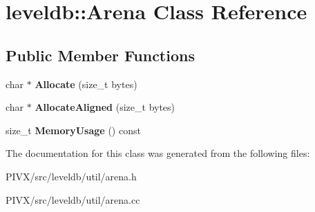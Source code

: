 \hypertarget{classleveldb_1_1_arena}{}\section{leveldb\+:\+:Arena Class Reference}
\label{classleveldb_1_1_arena}
\subsection*{Public Member Functions}
\begin{DoxyCompactItemize}
\item 
\mbox{\label{classleveldb_1_1_arena_add4bc4b1c8fdf5be7a96a7ec00a0732e}} 
char $\ast$ {\bfseries Allocate} (size\+\_\+t bytes)
\item 
\mbox{\label{classleveldb_1_1_arena_a9c1e8e695fe25ac96063f9fbacefee9e}} 
char $\ast$ {\bfseries Allocate\+Aligned} (size\+\_\+t bytes)
\item 
\mbox{\label{classleveldb_1_1_arena_a46ae29ec67c1b5aa9d1b258c2ead1aee}} 
size\+\_\+t {\bfseries Memory\+Usage} () const
\end{DoxyCompactItemize}


The documentation for this class was generated from the following files\+:\begin{DoxyCompactItemize}
\item 
P\+I\+V\+X/src/leveldb/util/arena.\+h\item 
P\+I\+V\+X/src/leveldb/util/arena.\+cc\end{DoxyCompactItemize}
